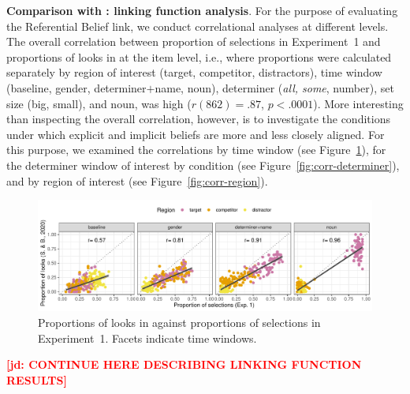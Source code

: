 \documentclass[10pt,letterpaper]{article}
\newcommand{\figref}[1]{Figure~\ref{#1}}
\newcommand{\expref}[1]{Experiment~#1}
\newcommand{\jd}[1]{\textcolor{Red}{\textbf{[jd: #1]}}}
\begin{document}
\textbf{Comparison with : linking function analysis}. For the purpose of evaluating the Referential Belief link, we conduct correlational analyses at different levels. The overall correlation between proportion of selections in \expref{1} and proportions of looks in  at the item level, i.e., where proportions were calculated separately by region of interest (target, competitor, distractors), time window (baseline, gender, determiner$+$name, noun), determiner (\emph{all, some}, number), set size (big, small), and noun, was high ($r(862) = .87$, $p < .0001$). More interesting than inspecting the overall correlation, however, is to investigate the conditions under which explicit and implicit beliefs are more and less closely aligned. For this purpose, we examined the correlations by time window (see \figref{fig:corr-window}), for the determiner window of interest by condition  (see \figref{fig:corr-determiner}), and by region of interest  (see \figref{fig:corr-region}).


\begin{figure}
\centering
\includegraphics[width=.9\textwidth]{../../analysis/SunBreheny/1_incremental/main/graphs/corr-window}
\caption{Proportions of looks in  against proportions of selections in \expref{1}. Facets indicate time windows.} 
\label{fig:corr-window}
\end{figure}



\jd{CONTINUE HERE DESCRIBING LINKING FUNCTION RESULTS}

%
\end{document}
